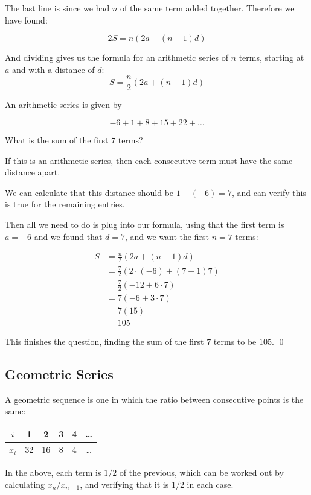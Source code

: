 The last line is since we had $n$ of the same term added together. Therefore we have found:

\[2S = n(2a + (n-1)d) \]

And dividing gives us the formula for an arithmetic series of $n$ terms, starting at $a$ and with a distance of $d$:
\[S = \frac{n}{2}(2a + (n-1)d) \]

\begin{example}
    An arithmetic series is given by

    \[ -6 + 1 + 8 + 15 + 22 + \dots\]

    What is the sum of the first $7$ terms?
\end{example}

\begin{solution}
    If this is an arithmetic series, then each consecutive term must have the same distance apart.

    We can calculate that this distance should be $1 - (-6) = 7$, and can verify this is true for the remaining entries.

    Then all we need to do is plug into our formula, using that the first term is $a = -6$ and we found that $d = 7$, and we want the first $n= 7$ terms:

    \begin{align*}
        S &= \frac{n}{2}(2a + (n-1)d) \\
         &= \frac{7}{2}(2\cdot(-6) + (7-1)7)\\
         &=  \frac{7}{2}(-12 + 6\cdot 7)\\
         &= 7(-6+3\cdot7)\\
         &= 7(15) \\
         &= 105
    \end{align*}

    This finishes the question, finding the sum of the first $7$ terms to be $105$.
    \qed
\end{solution}


\subsection{Geometric Series}

A geometric sequence is one in which the ratio between consecutive points is the same:

    \begin{center}
    \begin{tabular}{c|ccccc}
    $i$      & 1 & 2 & 3 & 4 & \dots\\
    \hline
    $x_i$ & 32 & 16 & 8 & 4 & \dots
    \end{tabular}
    \end{center}
In the above, each term is $1/2$ of the previous, which can be worked out by calculating $x_n / x_{n-1}$, and verifying that it is $1/2$ in each case.

